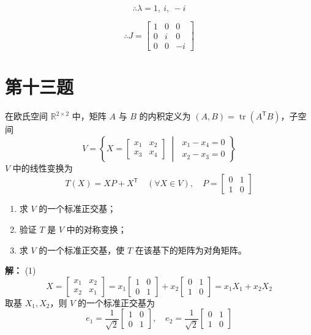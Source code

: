 \documentclass{article}
\begin{document}
\[
\therefore \lambda = 1,\ i,\ -i
\]

\[
\therefore J = \begin{bmatrix}
1 & 0 & 0 \\
0 & i & 0 \\
0 & 0 & -i
\end{bmatrix}
\]

\newpage
\section{第十三题}\noindent
在欧氏空间 $\mathbb{R}^{2\times2}$ 中，矩阵 $A$ 与 $B$ 的内积定义为 $(A,B)=\operatorname{tr}(A^{\mathsf{T}}B)$，子空间
\[
V = \left\{ X = \begin{bmatrix}
x_1 & x_2 \\
x_3 & x_4
\end{bmatrix} \;\middle|\;
\begin{array}{l}
x_1 - x_4 = 0 \\
x_2 - x_3 = 0
\end{array} \right\}
\]
$V$ 中的线性变换为
\[
T(X) = XP + X^{\mathsf{T}} \quad (\forall X \in V),\quad P = \begin{bmatrix}
0 & 1 \\
1 & 0
\end{bmatrix}
\]
\begin{enumerate}
\item 求 $V$ 的一个标准正交基；
\item 验证 $T$ 是 $V$ 中的对称变换；
\item 求 $V$ 的一个标准正交基，使 $T$ 在该基下的矩阵为对角矩阵。
\end{enumerate}
\textbf{解：}
(1)
\[
X = \begin{bmatrix}
x_1 & x_2 \\
x_2 & x_1
\end{bmatrix}
= x_1 \begin{bmatrix}
1 & 0 \\
0 & 1
\end{bmatrix}
+ x_2 \begin{bmatrix}
0 & 1 \\
1 & 0
\end{bmatrix}
= x_1 X_1 + x_2 X_2
\]
取基 \( X_1, X_2 \)，则 \( V \) 的一个标准正交基为
\[
e_1 = \frac{1}{\sqrt{2}} \begin{bmatrix} 1 & 0 \\ 0 & 1 \end{bmatrix}, \quad
e_2 = \frac{1}{\sqrt{2}} \begin{bmatrix} 0 & 1 \\ 1 & 0 \end{bmatrix}
\]
\end{document}
